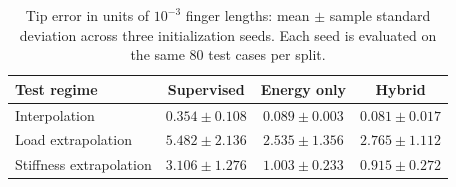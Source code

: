 \begin{table}[htbp]
\centering\small
\caption{Tip error in units of $10^{-3}$ finger lengths: mean $\pm$ sample standard deviation across three initialization seeds. Each seed is evaluated on the same 80 test cases per split.}\label{tab:tip}
\begin{tabular}{lccc}\toprule
Test regime & Supervised & Energy only & Hybrid\\\midrule
Interpolation & $0.354 \pm 0.108$ & $0.089 \pm 0.003$ & $0.081 \pm 0.017$\\
Load extrapolation & $5.482 \pm 2.136$ & $2.535 \pm 1.356$ & $2.765 \pm 1.112$\\
Stiffness extrapolation & $3.106 \pm 1.276$ & $1.003 \pm 0.233$ & $0.915 \pm 0.272$\\
\bottomrule\end{tabular}
\end{table}
